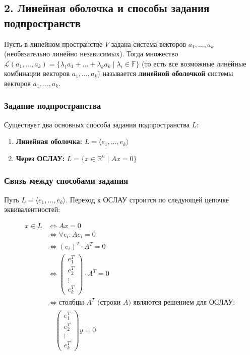 \subsection*{2. Линейная оболочка и способы задания подпространств}

\begin{definition}
Пусть в линейном пространстве $V$ задана система векторов $a_1, \dots, a_k$ (необязательно линейно независимых). Тогда множество $\mathcal{L}(a_1, \dots, a_k) = \{ \lambda_1 a_1 + \dots + \lambda_k a_k \mid \lambda_i \in \mathbb{F} \}$ (то есть все возможные линейные комбинации векторов $a_1, \dots, a_k$) называется \textbf{линейной оболочкой} системы векторов $a_1, \dots, a_k$.
\end{definition}

\subsubsection*{Задание подпространства}

Существует два основных способа задания подпространства $L$:
\begin{enumerate}
    \item \textbf{Линейная оболочка:} $L = \langle e_1, \dots, e_k \rangle$
    \item \textbf{Через ОСЛАУ:} $L = \{ x \in \mathbb{R}^n \mid Ax = 0 \}$
\end{enumerate}

\subsubsection*{Связь между способами задания}

Путь $L = \langle e_1, \dots, e_k \rangle$. Переход к ОСЛАУ строится по следующей цепочке эквивалентностей:

\begin{align*}
x \in L &\iff Ax = 0 \\
&\iff \forall e_i : Ae_i = 0 \\
&\iff (e_i)^T \cdot A^T = 0 \\
&\iff 
\begin{pmatrix}
e_1^T \\
e_2^T \\
\vdots \\
e_k^T
\end{pmatrix} \cdot A^T = 0 \\
&\iff \text{столбцы } A^T \text{ (строки } A\text{) являются решением для ОСЛАУ: } \\
& \quad \begin{pmatrix}
e_1^T \\
e_2^T \\
\vdots \\
e_k^T
\end{pmatrix} y = 0
\end{align*}


